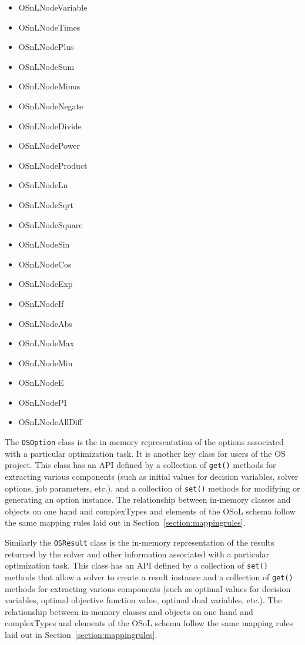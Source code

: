 \begin{itemize}
\item OSnLNodeVariable
\item OSnLNodeTimes
\item OSnLNodePlus
\item OSnLNodeSum
\item OSnLNodeMinus
\item OSnLNodeNegate
\item OSnLNodeDivide
\item OSnLNodePower
\item OSnLNodeProduct
\item OSnLNodeLn
\item OSnLNodeSqrt
\item OSnLNodeSquare
\item OSnLNodeSin
\item OSnLNodeCos
\item OSnLNodeExp
\item OSnLNodeIf
\item OSnLNodeAbs
\item OSnLNodeMax
\item OSnLNodeMin
\item OSnLNodeE
\item OSnLNodePI
\item OSnLNodeAllDiff
\end{itemize}



\label{section:osoptionclass}

The {\tt OSOption} class is the in-memory representation of the options 
associated with a particular optimization task. It is another key
class for users of the OS project. This class has an API defined by a collection of {\tt get()} methods for
extracting various components (such as initial values for decision variables, solver options, job parameters, etc.), 
and a collection of {\tt set()} methods for modifying or generating an option instance. The relationship between
in-memory classes and objects on one hand and complexTypes and elements of the OSoL schema follow the same mapping rules
laid out in Section~\ref{section:mappingrules}.

\label{section:osresultclass}

Similarly the {\tt OSResult} class is the in-memory representation of the 
results returned by the solver and other information associated with a particular optimization task. 
This class has an API defined by a collection of {\tt set()} methods that allow a solver to create a result instance
and a collection of {\tt get()} methods for
extracting various components (such as optimal values for decision variables, optimal objective function value, 
optimal dual variables, etc.). The relationship between
in-memory classes and objects on one hand and complexTypes and elements of the OSoL schema follow the same 
mapping rules laid out in Section~\ref{section:mappingrules}.



